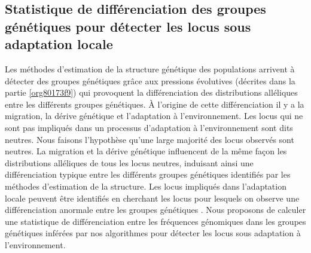 \documentclass[12pt,a4paper,twoside]{ugathesis}
\begin{document}
\subsection{Statistique de différenciation des groupes génétiques pour détecter les locus sous adaptation locale}
\label{sec:org415a8f7}

Les méthodes d'estimation de la structure génétique des populations arrivent à
détecter des groupes génétiques grâce aux pressions évolutives (décrites dans
la partie \ref{org80173f9}) qui provoquent la différenciation des distributions
alléliques entre les différents groupes génétiques. À l'origine de cette
différenciation il y a la migration, la dérive génétique et l'adaptation à
l'environnement. Les locus qui ne sont pas impliqués dans un processus
d'adaptation à l'environnement sont dits neutres. Nous faisons l'hypothèse
qu'une large majorité des locus observés sont neutres. La migration et la dérive
génétique influencent de la même façon les distributions alléliques de tous les
locus neutres, induisant ainsi une différenciation typique entre les différents
groupes génétiques identifiés par les méthodes d'estimation de la structure.
Les locus impliqués dans l'adaptation locale peuvent être identifiés en
cherchant les locus pour lesquels on observe une différenciation anormale entre
les groupes génétiques \citep{Lewontin175}. Nous proposons de calculer une
statistique de différenciation entre les fréquences génomiques dans les groupes
génétiques inférées par nos algorithmes pour détecter les locus sous adaptation
à l'environnement.
\end{document}
